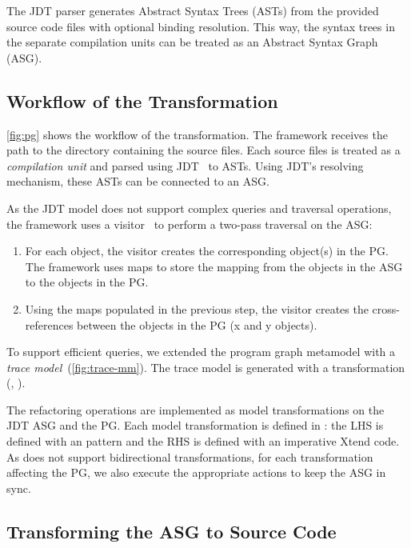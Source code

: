 \documentclass[submission,copyright,creativecommons]{eptcs}
\begin{document}
The JDT parser generates Abstract Syntax Trees (ASTs) from the provided source code files with optional binding resolution. This way, the syntax trees in the separate compilation units can be treated as an Abstract Syntax Graph (ASG).

\subsection{Workflow of the Transformation}


\autoref{fig:pg} shows the workflow of the transformation. The framework receives the path to the directory containing the source files. Each source files is treated as a \emph{compilation unit} and parsed using JDT~ to ASTs. Using JDT's resolving mechanism, these ASTs can be connected to an ASG.

As the JDT model does not support complex queries and traversal operations, the framework uses a visitor~ to perform a two-pass traversal on the ASG:

\begin{enumerate}[noitemsep]
\item For each object, the visitor creates the corresponding object(s) in the PG. The framework uses maps to store the mapping from the objects in the ASG to the objects in the PG.
\item Using the maps populated in the previous step, the visitor creates the cross-references between the objects in the PG (\eg x and y objects).
\end{enumerate}

To support efficient queries, we extended the program graph metamodel with a \emph{trace model}~(\autoref{fig:trace-mm}). The trace model is generated with a \viatra transformation (, ).

The refactoring operations are implemented as model transformations on the JDT ASG and the PG. Each model transformation is defined in \viatra: the LHS is defined with an \eiq pattern and the RHS is defined with an imperative Xtend code. As \viatra does not support bidirectional transformations, for each transformation affecting the PG, we also execute the appropriate actions to keep the ASG in sync.


\subsection{Transforming the ASG to Source Code}
\end{document}
